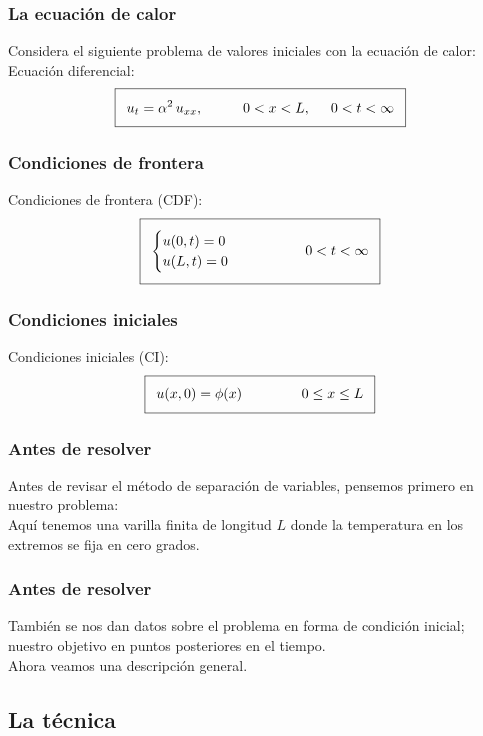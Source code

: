 \documentclass[12pt]{beamer}
\begin{document}
\begin{frame}
\frametitle{La ecuación de calor}
Considera el siguiente problema de valores iniciales con la ecuación de calor:
\\
\bigskip
\pause
Ecuación diferencial:
\begin{align*}
\addtolength{\fboxsep}{5pt}\boxed{ u_{t} = \alpha^{2} \, u_{xx}, \hspace{1cm} 0 < x < L,\hspace{0.5cm} 0 < t < \infty}
\end{align*}
\end{frame}
\begin{frame}
\frametitle{Condiciones de frontera}
Condiciones de frontera (CDF):
\begin{align*}
\addtolength{\fboxsep}{5pt}\boxed{
\begin{cases}
u(0, t) = 0 \\
u(L, t) = 0
\end{cases}
\hspace{1.5cm}
0 < t < \infty }
\end{align*}
\end{frame}
\begin{frame}
\frametitle{Condiciones iniciales}
Condiciones iniciales (CI):
\begin{align*}
\addtolength{\fboxsep}{5pt}\boxed{
u(x, 0) = \phi (x) \hspace{1.5cm} 0 \leq x \leq L
}
\end{align*}
\end{frame}
\begin{frame}
\frametitle{Antes de resolver}
Antes de revisar el método de separación de variables, pensemos primero en nuestro problema: 
\\
\bigskip
\pause
Aquí tenemos una varilla finita de longitud $L$ donde la temperatura en los extremos se fija en cero grados.
\end{frame}
\begin{frame}
\frametitle{Antes de resolver}
También se nos dan datos sobre el problema en forma de condición inicial; \pause nuestro objetivo  en puntos posteriores en el tiempo.
\\
\bigskip
\pause
Ahora veamos una descripción general.
\end{frame}

\subsection{La técnica}
\end{document}
